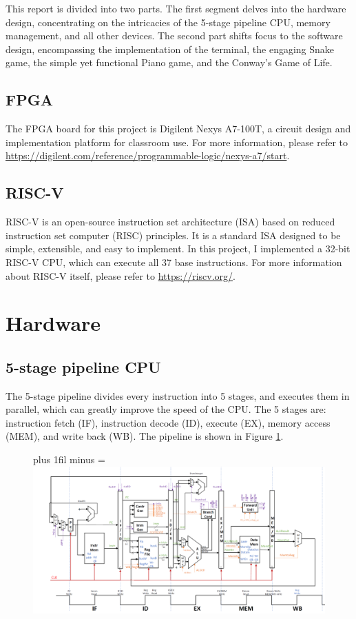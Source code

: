 \documentclass[
	a4paper, %
	11pt, %
]{CSUniSchoolLabReport}
\def\Scentering{\leftskip=0pt plus 1fil minus \Rmargin
                \rightskip=\leftskip}
\begin{document}
This report is divided into two parts. The first segment delves into the hardware design, concentrating on the intricacies of the 5-stage pipeline CPU, memory management, and all other devices. The second part shifts focus to the software design, encompassing the implementation of the terminal, the engaging Snake game, the simple yet functional Piano game, and the Conway's Game of Life.

\subsection{FPGA}
The FPGA board for this project is Digilent Nexys A7-100T, a circuit design and implementation platform for classroom use. For more information, please refer to \url{https://digilent.com/reference/programmable-logic/nexys-a7/start}.

\subsection{RISC-V}
RISC-V is an open-source instruction set architecture (ISA) based on reduced instruction set computer (RISC) principles. It is a standard ISA designed to be simple, extensible, and easy to implement. In this project, I implemented a 32-bit RISC-V CPU, which can execute all 37 base instructions. For more information about RISC-V itself, please refer to \url{https://riscv.org/}.
\section{Hardware}

\subsection{5-stage pipeline CPU}
The 5-stage pipeline divides every instruction into 5 stages, and executes them in parallel, which can greatly improve the speed of the CPU. The 5 stages are: instruction fetch (IF), instruction decode (ID), execute (EX), memory access (MEM), and write back (WB). The pipeline is shown in Figure \ref{fig:image2}.

\begin{figure}[htbp]
    \Scentering
    \includegraphics[width=.9\paperwidth]{image2.png}
    \caption{}
    \label{fig:image2}
\end{figure}
\end{document}

